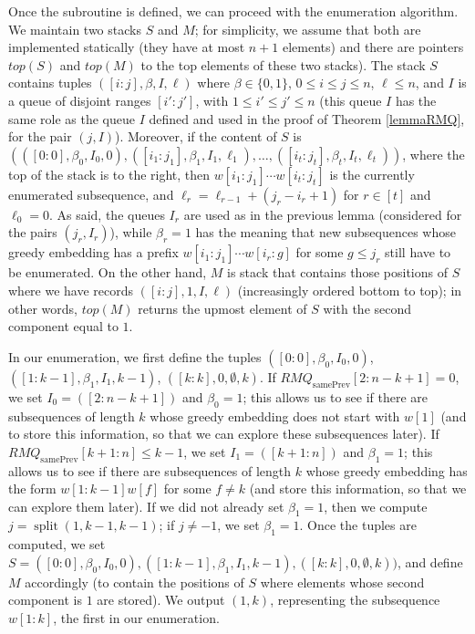 \documentclass[10pt,a4paper]{amsart}
\makeatletter
\DeclareMathOperator{\splitt}{split}
\DeclareMathOperator{\prevArray}{samePrev}
\theoremstyle{plain}
\theoremstyle{definition}
\renewenvironment{proof}[1][\proofname]{\par
  \pushQED{}%
  \normalfont \topsep6\p@\@plus6\p@\relax
  \trivlist
  \item[\hskip\labelsep\itshape #1\@addpunct{.}]\ignorespaces
}{%
  \popQED\endtrivlist\@endpefalse
}
\makeatother
\begin{document}
\begin{proof}
Once the subroutine is defined, we can proceed with the enumeration algorithm. We maintain two stacks $S$ and $M$; for simplicity, we assume that both are implemented statically (they have at most $n+1$ elements) and there are pointers $top(S)$ and $top(M)$ to the top elements of these two stacks). The stack $S$ contains tuples $([i:j], \beta, I, \ell)$ where $\beta\in \{0,1\}$, $0\leq i\leq j\leq n$, $\ell\leq n$, and $I$ is a queue of disjoint ranges $[i':j']$, with $1\leq i'\leq j'\leq n$ (this queue $I$ has the same role as the queue $I$ defined and used in the proof of Theorem \ref{lemmaRMQ}, for the pair $(j,I)$). Moreover, if the content of $S$ is $(([0:0], \beta_0, I_0, 0), ([i_1:j_1], \beta_1, I_1, \ell_1), \ldots, ([i_t:j_t], \beta_t, I_t, \ell_t))$, where the top of the stack is to the right, then $w[i_1:j_1]\cdots w[i_t:j_t]$ is the currently enumerated subsequence, and $\ell_r=\ell_{r-1}+(j_r-i_r+1)$ for $r\in [t]$ and $\ell_0=0$. As said, the queues $I_r$ are used as in the previous lemma (considered for the pairs $(j_r,I_r)$), while $\beta_r=1$ has the meaning that new subsequences whose greedy embedding has a  prefix $w[i_1:j_1]\cdots w[i_r:g]$ for some $g\leq j_r$ still have to be enumerated. On the other hand, $M$ is stack that contains those positions of $S$ where we have records $([i:j], 1, I, \ell)$ (increasingly ordered bottom to top); in other words, $top(M)$ returns the upmost element of $S$ with the second component equal to $1$. 

In our enumeration, we first define the tuples $([0:0], \beta_0, I_0, 0)$, $([1:k-1], \beta_1, I_1, k-1)$, $([k:k], 0, \emptyset, k)$. If $RMQ_{\prevArray}[2:n-k+1]= 0$, we set $I_0=([2:n-k+1])$ and $\beta_0=1$; this allows us to see if there are subsequences of length $k$ whose greedy embedding does not start with $w[1]$ (and to store this information, so that we can explore these subsequences later). If $RMQ_{\prevArray}[k+1:n]\leq k-1$, we set $I_1=([k+1:n])$ and $\beta_1=1$; this allows us to see if there are subsequences of length $k$ whose greedy embedding has the form $w[1:k-1]w[f]$ for some $f\neq k$ (and store this information, so that we can explore them later). If we did not already set $\beta_1=1$, then we compute $j=\splitt(1,k-1,k-1)$; if $j\neq -1$, we set $\beta_1=1$. Once the tuples are computed, we set $S=([0:0], \beta_0, I_0, 0), ([1:k-1], \beta_1, I_1, k-1), ([k:k], 0, \emptyset, k))$, and define $M$ accordingly (to contain the positions of $S$ where elements whose second component is $1$ are stored). We output $(1,k)$, representing the subsequence $w[1:k]$, the first in our enumeration. 


\end{proof}
\end{document}
